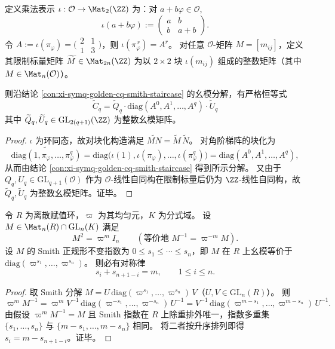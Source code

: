 \begin{conclusion}\label{con:xi-symq-golden-cq-restriction-of-scalars-block-diagonal}
定义乘法表示 \(\iota:\mathcal O\to\Mat_2(\ZZ)\) 为：对 \(a+b\varphi\in\mathcal O\),
\[
\iota(a+b\varphi):=
\begin{pmatrix}a&b\\[2pt]b&a+b\end{pmatrix}.
\]
令 \(A:=\iota(\pi_\varphi)=\bigl(\begin{smallmatrix}2&1\\[2pt]1&3\end{smallmatrix}\bigr)\)，则 \(\iota(\pi_\varphi^{\,r})=A^{r}\)。
对任意 \(\mathcal O\)-矩阵 \(M=[m_{ij}]\)，定义其限制标量矩阵 \(\widetilde M\in\Mat_{2n}(\ZZ)\) 为以 \(2\times 2\) 块 \(\iota(m_{ij})\) 组成的整数矩阵（其中 \(M\in\Mat_n(\mathcal O)\)）。
\par
则沿结论 \ref{con:xi-symq-golden-cq-smith-staircase} 的幺模分解，有严格恒等式
\[
\boxed{\;
\widetilde C_q
=\widetilde Q_q\cdot \mathrm{diag}(A^{0},A^{1},\dots,A^{q})\cdot \widetilde U_q\;}
\]
其中 \(\widetilde Q_q,\widetilde U_q\in\mathrm{GL}_{2(q+1)}(\ZZ)\) 为整数幺模矩阵。
\end{conclusion}
\begin{proof}
\(\iota\) 为环同态，故对块化构造满足 \(\widetilde{MN}=\widetilde M\,\widetilde N\)。
对角阶梯阵的块化为
\[
\widetilde{\mathrm{diag}(1,\pi_\varphi,\dots,\pi_\varphi^q)}
=\mathrm{diag}\bigl(\iota(1),\iota(\pi_\varphi),\dots,\iota(\pi_\varphi^q)\bigr)
=\mathrm{diag}(A^0,A^1,\dots,A^q),
\]
从而由结论 \ref{con:xi-symq-golden-cq-smith-staircase} 得到所示分解。
又由于 \(Q_q,U_q\in\mathrm{GL}_{q+1}(\mathcal O)\) 作为 \(\mathcal O\)-线性自同构在限制标量后仍为 \(\ZZ\)-线性自同构，故 \(\widetilde Q_q,\widetilde U_q\) 为整数幺模矩阵。证毕。
\end{proof}

\begin{conclusion}\label{con:xi-dvr-selfinverse-smith-symmetry}
令 \(R\) 为离散赋值环，\(\varpi\) 为其均匀元，\(K\) 为分式域。
设 \(M\in\Mat_n(R)\cap\mathrm{GL}_n(K)\) 满足
\[
M^2=\varpi^{m}I_n
\qquad(\text{等价地 }M^{-1}=\varpi^{-m}M).
\]
设 \(M\) 的 Smith 正规形不变指数为 \(0\le s_1\le\cdots\le s_n\)，即 \(M\) 在 \(R\) 上幺模等价于
\(\mathrm{diag}(\varpi^{s_1},\dots,\varpi^{s_n})\)。
则必有对称律
\[
\boxed{\;
s_i+s_{n+1-i}=m,\qquad 1\le i\le n.\;}
\]
\end{conclusion}
\begin{proof}
取 Smith 分解 \(M=U\,\mathrm{diag}(\varpi^{s_1},\dots,\varpi^{s_n})\,V\)（\(U,V\in\mathrm{GL}_n(R)\)）。
则
\[
\varpi^{m}M^{-1}
=\varpi^{m}V^{-1}\,\mathrm{diag}(\varpi^{-s_1},\dots,\varpi^{-s_n})\,U^{-1}
=V^{-1}\,\mathrm{diag}(\varpi^{m-s_1},\dots,\varpi^{m-s_n})\,U^{-1}.
\]
由假设 \(\varpi^{m}M^{-1}=M\) 且 Smith 指数在 \(R\) 上除重排外唯一，指数多重集 \(\{s_1,\dots,s_n\}\) 与 \(\{m-s_1,\dots,m-s_n\}\) 相同。
将二者按升序排列即得 \(s_i=m-s_{n+1-i}\)。证毕。
\end{proof}

